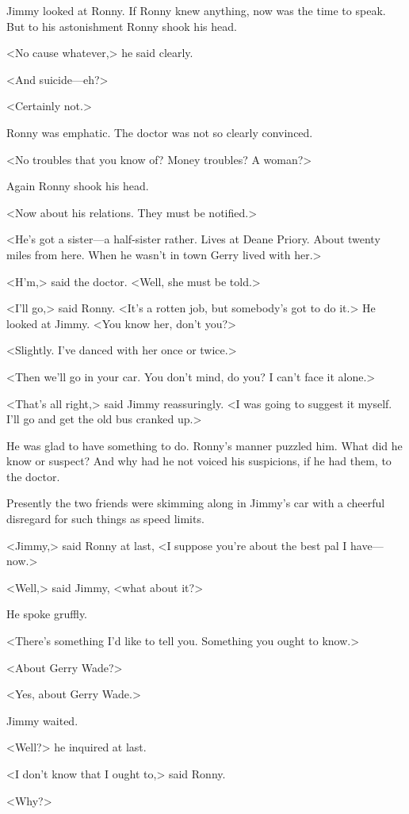 Jimmy looked at Ronny. If Ronny knew anything, now was the time to speak. But to his astonishment Ronny shook his head.

<No cause whatever,> he said clearly.

<And suicide—eh?>

<Certainly not.>

Ronny was emphatic. The doctor was not so clearly convinced.

<No troubles that you know of? Money troubles? A woman?>

Again Ronny shook his head.

<Now about his relations. They must be notified.>

<He's got a sister—a half-sister rather. Lives at Deane Priory. About twenty miles from here. When he wasn't in town Gerry lived with her.>

<H'm,> said the doctor. <Well, she must be told.>

<I'll go,> said Ronny. <It's a rotten job, but somebody's got to do it.> He looked at Jimmy. <You know her, don't you?>

<Slightly. I've danced with her once or twice.>

<Then we'll go in your car. You don't mind, do you? I can't face it alone.>

<That's all right,> said Jimmy reassuringly. <I was going to suggest it myself. I'll go and get the old bus cranked up.>

He was glad to have something to do. Ronny's manner puzzled him. What did he know or suspect? And why had he not voiced his suspicions, if he had them, to the doctor.

Presently the two friends were skimming along in Jimmy's car with a cheerful disregard for such things as speed limits.

<Jimmy,> said Ronny at last, <I suppose you're about the best pal I have—now.>

<Well,> said Jimmy, <what about it?>

He spoke gruffly.

<There's something I'd like to tell you. Something you ought to know.>

<About Gerry Wade?>

<Yes, about Gerry Wade.>

Jimmy waited.

<Well?> he inquired at last.

<I don't know that I ought to,> said Ronny.

<Why?>


